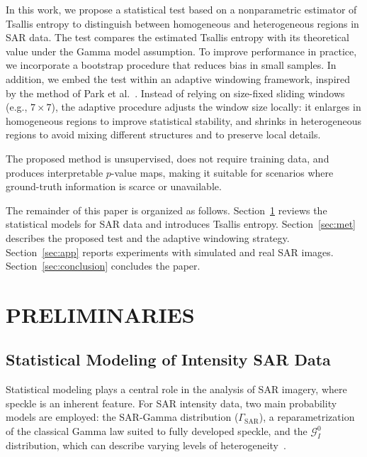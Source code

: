 \documentclass[
  lettersize  journal,
]{IEEEtran}%
\begin{document}
In this work, we propose a statistical test based on a nonparametric
estimator of Tsallis entropy to distinguish between homogeneous and
heterogeneous regions in SAR data. The test compares the estimated
Tsallis entropy with its theoretical value under the Gamma model
assumption. To improve performance in practice, we incorporate a
bootstrap procedure that reduces bias in small samples. In addition, we
embed the test within an adaptive windowing framework, inspired by the
method of Park et al.~. Instead of
relying on size-fixed sliding windows (e.g., \(7 \times 7\)), the
adaptive procedure adjusts the window size locally: it enlarges in
homogeneous regions to improve statistical stability, and shrinks in
heterogeneous regions to avoid mixing different structures and to
preserve local details.

The proposed method is unsupervised, does not require training data, and
produces interpretable \(p\)-value maps, making it suitable for
scenarios where ground-truth information is scarce or unavailable.

The remainder of this paper is organized as follows.
Section~\ref{sec:pre} reviews the statistical models for SAR data and
introduces Tsallis entropy. Section~\ref{sec:met} describes the proposed
test and the adaptive windowing strategy. Section~\ref{sec:app} reports
experiments with simulated and real SAR images.
Section~\ref{sec:conclusion} concludes the paper.

\section{PRELIMINARIES}\label{sec:pre}

\subsection{Statistical Modeling of Intensity SAR
Data}\label{statistical-modeling-of-intensity-sar-data}

Statistical modeling plays a central role in the analysis of SAR
imagery, where speckle is an inherent feature. For SAR intensity data,
two main probability models are employed: the SAR-Gamma distribution
(\(\Gamma_{\text{SAR}}\)), a reparametrization of the classical Gamma
law suited to fully developed speckle, and the \(\mathcal{G}^0_I\)
distribution, which can describe varying levels of
heterogeneity~.
\end{document}
